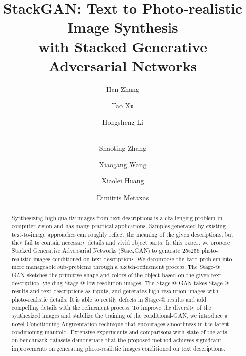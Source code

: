 \documentclass[10pt,twocolumn,letterpaper]{article}
\makeatletter
\newcommand{\Rmnum}[1]{\expandafter\@slowromancap\romannumeral #1@}
\makeatother
\begin{document}
\title{StackGAN: Text to Photo-realistic Image Synthesis \\ with Stacked Generative Adversarial Networks}


\author[1]{Han Zhang} 
\author[2]{\;Tao Xu} 
\author[3]{\;Hongsheng Li} 
\author[4]{\\Shaoting Zhang}
\author[3]{\;Xiaogang  Wang}
\author[2]{\;Xiaolei Huang}
\author[1]{\;Dimitris Metaxas}

\renewcommand\Authands{, }  



\maketitle


\begin{abstract}

Synthesizing high-quality images from text descriptions is a challenging problem in computer vision and has many practical applications. Samples generated by existing text-to-image approaches can roughly reflect the meaning of the given descriptions, but they fail to contain necessary details and vivid object parts. In this paper, we propose Stacked Generative Adversarial Networks (StackGAN) to generate 256256 photo-realistic images conditioned on text descriptions. We decompose the hard problem into more manageable sub-problems through a sketch-refinement process. The Stage-\Rmnum{1} GAN sketches the primitive shape and colors of the object based on the given text description, yielding Stage-\Rmnum{1} low-resolution images. The Stage-\Rmnum{2} GAN takes Stage-\Rmnum{1} results and text descriptions as inputs, and generates high-resolution images with photo-realistic details. It is able to rectify defects in Stage-\Rmnum{1} results and add compelling details with the refinement process. To improve the diversity of the synthesized images and stabilize the training of the conditional-GAN, we introduce a novel Conditioning Augmentation technique that encourages smoothness in the latent conditioning manifold. Extensive experiments and comparisons with state-of-the-arts on benchmark datasets demonstrate that the proposed method achieves significant improvements on generating photo-realistic images conditioned on text descriptions.


\end{abstract}
\end{document}
